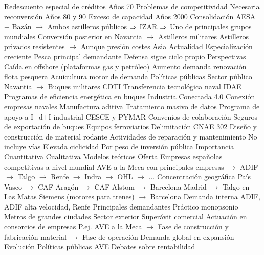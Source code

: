 \documentclass{nuevotema}
\begin{document}
\begin{esquemal}
				\4[] Redescuento especial de créditos
				\4 Años 70
				\4[] Problemas de competitividad
				\4[] Necesaria reconversión
				\4 Años 80 y 90
				\4[] Exceso de capacidad
				\4 Años 2000
				\4[] Consolidación
				\4[] AESA + Bazán
				\4[] $\to$ Ambos astilleros públicos
				\4[] $\Rightarrow$ IZAR
				\4[] $\Rightarrow$ Uno de principales grupos mundiales
				\4[] Conversión posterior en Navantia
				\4[] $\to$ Astilleros militares
				\4[] Astilleros privados resistentes
				\4[] $\to$ Aunque presión costes Asia
				\4 Actualidad
				\4[] Especialización creciente
				\4[] Pesca principal demandante
				\4[] Defensa sigue ciclo propio
				\4 Perspectivas
				\4[] Caída en offshore (plataformas gas y petróleo)
				\4[] Aumento demanda renovación flota pesquera
				\4[] Acuicultura motor de demanda
			\3 Políticas públicas
				\4 Sector público
				\4[] Navantia
				\4[] $\to$ Buques militares
				\4 CDTI
				\4[] Transferencia tecnológica naval
				\4 IDAE
				\4[] Programas de eficiencia energética en buques
				\4 Industria Conectada 4.0
				\4[] Conexión empresas navales
				\4[] Manufactura aditiva
				\4[] Tratamiento masivo de datos
				\4 Programa de apoyo a I+d+I industrial
				\4 CESCE y PYMAR
				\4[] Convenios de colaboración
				\4[] Seguros de exportación de buques
		\2 Equipos ferroviarios
			\3 Delimitación
				\4 CNAE 302
				\4 Diseño y construcción de material rodante
				\4 Actividades de reparación y mantenimiento
				\4 No incluye vías
				\4 Elevada ciclicidad
				\4[] Por peso de inversión pública
			\3 Importancia
				\4 Cuantitativa
				\4 Cualitativa
			\3 Modelos teóricos
			\3 Oferta
				\4 Empresas españolas competitivas a nivel mundial
				\4[] AVE a la Meca con principales empresas
				\4[] $\to$ ADIF
				\4[] $\to$ Talgo
				\4[] $\to$ Renfe
				\4[] $\to$ Indra
				\4[] $\to$ OHL
				\4[] $\to$ ...
				\4 Concentración geográfica
				\4[] País Vasco
				\4[] $\to$ CAF
				\4[] Aragón
				\4[] $\to$ CAF
				\4[] Alstom
				\4[] $\to$ Barcelona
				\4[] Madrid
				\4[] $\to$ Talgo en Las Matas
				\4[] Siemens (motores para trenes)
				\4[] $\to$ Barcelona
			\3 Demanda interna
				\4 ADIF, ADIF alta velocidad, Renfe
				\4[] Principales demandantes
				\4[] Práctico monopsonio
				\4 Metros de grandes ciudades
			\3 Sector exterior
				\4 Superávit comercial
				\4 Actuación en consorcios de empresas
				\4[] P.ej. AVE a la Meca
				\4[] $\to$ Fase de construcción y fabricación material
				\4[] $\to$ Fase de operación
				\4 Demanda global en expansión
			\3 Evolución
			\3 Políticas públicas
				\4 AVE
				\4[] Debates sobre rentabilidad

\end{esquemal}
\end{document}
